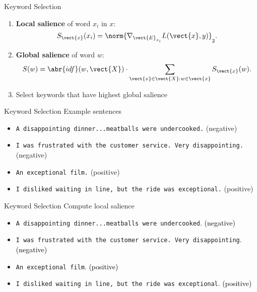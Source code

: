 \begin{frame}{Keyword Selection}
    \begin{enumerate}
        \item<1-> \textbf{Local salience} of word $x_i$ in $x$:
            \begin{equation*}   S_{\vect{x}}(x_i) = \norm{\nabla_{\vect{E}_{x_i}} L(\vect{x}, y)}_2.
            \end{equation*}
        \item<2-> \textbf{Global salience} of word $w$:
            \begin{equation*}
            S(w) = \abr{idf}(w, \vect{X}) \cdot \sum_{\vect{x} \in
            \vect{X}: w \in \vect{x}} S_{\vect{x}}(w).
            \end{equation*}
        \item<3-> Select keywords that have highest global salience
    \end{enumerate}
\end{frame}


\begin{frame}{Keyword Selection}
    Example sentences \\
    \begin{itemize}
        \item[] \texttt{A disappointing dinner...meatballs were undercooked.}
            (negative)
        \item[] \texttt{I was frustrated with the customer service. Very
            disappointing.}
            (negative)
        \item[] \texttt{An exceptional film.} (positive)
        \item[] \texttt{I disliked waiting in line, but the ride was exceptional.} (positive)
    \end{itemize}
\end{frame}

\begin{frame}{Keyword Selection}
    Compute local salience \\
    \begin{itemize}
        \color{salience1}
    \item[] \texttt{A \textcolor{salience4}{disappointing}
        \textcolor{salience3}{dinner}...\textcolor{salience2}{meatballs} were
            \textcolor{salience3}{undercooked}}. \textcolor{black}{(negative)}
    \item[] \texttt{\textcolor{salience2}{I} was
        \textcolor{salience4}{frustrated} with the customer
            \textcolor{salience3}{service}. \textcolor{salience4}{Very}
            \textcolor{salience4}{disappointing}}.
            \textcolor{black}{(negative)}
        \item[] \texttt{An \textcolor{salience4}{exceptional}
            \textcolor{salience3}{film}}. \textcolor{black}{(positive)}
        \item[] \texttt{\textcolor{salience2}{I} \textcolor{salience4}{disliked}
            \textcolor{salience3}{waiting} in \textcolor{salience2}{line}, but the
            \textcolor{salience2}{ride} was \textcolor{salience4}{exceptional}}. \textcolor{black}{(positive)}
    \end{itemize}
\end{frame}

